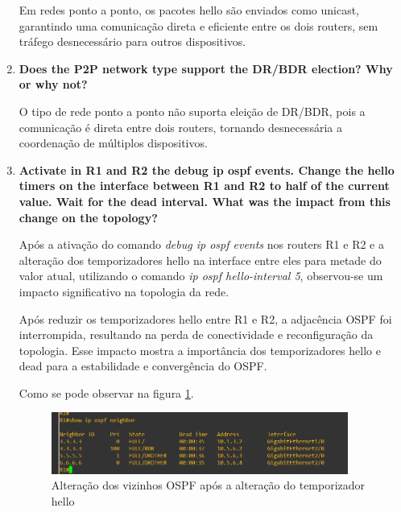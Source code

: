 \documentclass[11pt,english, openright, oneside]{book}
\begin{document}
\begin{enumerate}
  \par Em redes ponto a ponto, os pacotes hello são enviados como unicast, garantindo uma comunicação direta e eficiente entre os dois routers, sem tráfego desnecessário para outros dispositivos.
  \vspace{0.2cm}

  \item \textbf{Does the P2P network type support the DR/BDR election? Why or why not?}
  \vspace{0.2cm}

  \par O tipo de rede ponto a ponto não suporta eleição de DR/BDR, pois a comunicação é direta entre dois routers, tornando desnecessária a coordenação de múltiplos dispositivos.
  \vspace{0.2cm}

  \item \textbf{Activate in R1 and R2 the debug ip ospf events. Change the hello timers on the interface between R1 and 
  R2 to half of the current value. Wait for the dead interval. What was the impact from this change on the 
  topology?}
  \vspace{0.2cm}

  \par Após a ativação do comando \textit{debug ip ospf events} nos routers R1 e R2 e a alteração dos temporizadores hello na interface entre eles para metade do valor atual, utilizando o comando \textit{ip ospf hello-interval 5}, observou-se um impacto significativo na topologia da rede.
  \vspace{0.2cm}

  \par Após reduzir os temporizadores hello entre R1 e R2, a adjacência OSPF foi interrompida, resultando na perda de conectividade e reconfiguração da topologia. Esse impacto mostra a importância dos temporizadores hello e dead para a estabilidade e convergência do OSPF.
  \vspace{0.2cm}

  Como se pode observar na figura \ref{fig:config14}.
  \vspace{0.2cm}

  \begin{figure}[H]
    \centering
    \includegraphics[width=0.92\textwidth]{imagens/Tarefa2/10.hello.png}
    \caption{Alteração dos vizinhos OSPF após a alteração do temporizador hello}
    \label{fig:config14}
  \end{figure}
  \vspace{0.2cm}


\end{enumerate}
\end{document}
